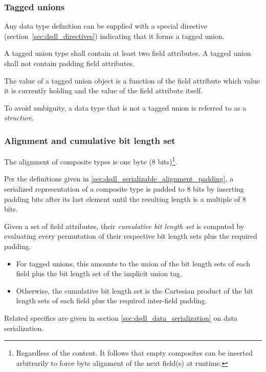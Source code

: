 \subsubsection{Tagged unions}\label{sec:dsdl_composite_tagged_unions}

Any data type definition can be supplied with a special directive (section~\ref{sec:dsdl_directives})
indicating that it forms a tagged union.

A tagged union type shall contain at least two field attributes.
A tagged union shall not contain padding field attributes.

The value of a tagged union object is a function of the field attribute which value it is currently holding
and the value of the field attribute itself.

To avoid ambiguity, a data type that is not a tagged union is referred to as a \emph{structure}.

\subsubsection{Alignment and cumulative bit length set}\label{sec:dsdl_composite_alignment_cumulative_bls}

The alignment of composite types is one byte (8 bits)\footnote{%
    Regardless of the content.
    It follows that empty composites can be inserted arbitrarily to force byte alignment
    of the next field(s) at runtime.
}.

Per the definitions given in \ref{sec:dsdl_serializable_alignment_padding},
a serialized representation of a composite type is padded to 8 bits by inserting padding bits
after its last element until the resulting length is a multiple of 8 bits.

Given a set of field attributes, their \emph{cumulative bit length set} is computed
by evaluating every permutation of their respective bit length sets plus the required padding.
\begin{itemize}
    \item For tagged unions, this amounts to the union of the bit length sets of each field
    plus the bit length set of the implicit union tag.
    \item Otherwise, the cumulative bit length set is the Cartesian product of the bit length sets of each field
    plus the required inter-field padding.
\end{itemize}
Related specifics are given in section \ref{sec:dsdl_data_serialization} on data serialization.

